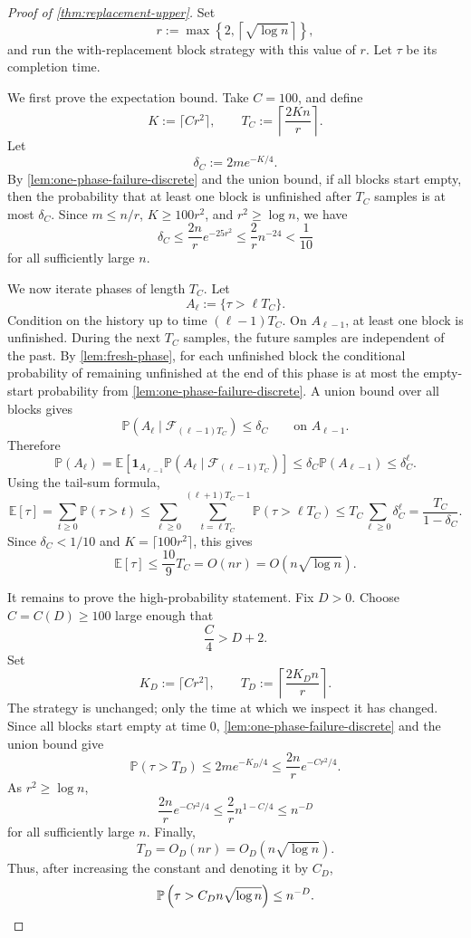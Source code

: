 \documentclass[11pt,reqno,letterpaper]{amsart}
\theoremstyle{definition}
\numberwithin{equation}{section}
\renewcommand{\P}{\mathbb{P}}
\newcommand{\mc}{\mathcal}
\newcommand{\mb}{\mathbb}
\newcommand{\mbf}{\mathbf}
\begin{document}
\begin{proof}[Proof of \cref{thm:replacement-upper}]
Set
\[
r:=\max\left\{2,\left\lceil \sqrt{\log n}\right\rceil\right\},
\]
and run the with-replacement block strategy with this value of \(r\). Let \(\tau\) be its completion time.

We first prove the expectation bound. Take \(C=100\), and define
\[
K:=\lceil Cr^2\rceil,
\qquad
T_C:=\left\lceil \frac{2Kn}{r}\right\rceil.
\]
Let
\[
\delta_C:=2m e^{-K/4}.
\]
By \cref{lem:one-phase-failure-discrete} and the union bound, if all blocks start empty, then the probability that at least one block is unfinished after \(T_C\) samples is at most \(\delta_C\). Since \(m\le n/r\), \(K\ge100r^2\), and \(r^2\ge\log n\), we have
\[
\delta_C
\le
\frac{2n}{r}e^{-25r^2}
\le
\frac{2}{r}n^{-24}
<
\frac1{10}
\]
for all sufficiently large \(n\).

We now iterate phases of length \(T_C\). Let
\[
A_\ell:=\{\tau>\ell T_C\}.
\]
Condition on the history up to time \((\ell-1)T_C\). On \(A_{\ell-1}\), at least one block is unfinished. During the next \(T_C\) samples, the future samples are independent of the past. By \cref{lem:fresh-phase}, for each unfinished block the conditional probability of remaining unfinished at the end of this phase is at most the empty-start probability from \cref{lem:one-phase-failure-discrete}. A union bound over all blocks gives
\[
\P(A_\ell\mid \mc F_{(\ell-1)T_C})
\le
\delta_C
\qquad\text{on }A_{\ell-1}.
\]
Therefore
\[
\P(A_\ell)
=
\mb{E}\left[
\mbf1_{A_{\ell-1}}
\P(A_\ell\mid \mc F_{(\ell-1)T_C})
\right]
\le
\delta_C\P(A_{\ell-1})
\le
\delta_C^\ell.
\]
Using the tail-sum formula,
\[
\mb{E}[\tau]
=
\sum_{t\ge0}\P(\tau>t)
\le
\sum_{\ell\ge0}\sum_{t=\ell T_C}^{(\ell+1)T_C-1}\P(\tau>\ell T_C)
\le
T_C\sum_{\ell\ge0}\delta_C^\ell
=
\frac{T_C}{1-\delta_C}.
\]
Since \(\delta_C<1/10\) and \(K=\lceil100r^2\rceil\), this gives
\[
\mb{E}[\tau]\le \frac{10}{9}T_C=O(nr)=O(n\sqrt{\log n}).
\]

It remains to prove the high-probability statement. Fix \(D>0\). Choose \(C=C(D)\ge100\) large enough that
\[
\frac C4>D+2.
\]
Set
\[
K_D:=\lceil Cr^2\rceil,
\qquad
T_D:=\left\lceil \frac{2K_Dn}{r}\right\rceil.
\]
The strategy is unchanged; only the time at which we inspect it has changed. Since all blocks start empty at time \(0\), \cref{lem:one-phase-failure-discrete} and the union bound give
\[
\P(\tau>T_D)
\le
2m e^{-K_D/4}
\le
\frac{2n}{r}e^{-Cr^2/4}.
\]
As \(r^2\ge\log n\),
\[
\frac{2n}{r}e^{-Cr^2/4}
\le
\frac2r n^{1-C/4}
\le
n^{-D}
\]
for all sufficiently large \(n\). Finally,
\[
T_D=O_D(nr)=O_D(n\sqrt{\log n}).
\]
Thus, after increasing the constant and denoting it by \(C_D\),
\[
\P\left(\tau>C_D n\sqrt{\log n}\right)\le n^{-D}. \qedhere
\]
\end{proof}




\end{document}
